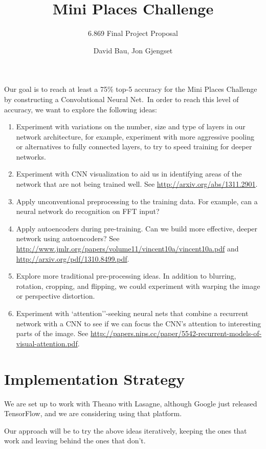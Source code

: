 \documentclass[letterpaper]{scrartcl}
\title{Mini Places Challenge}
\subtitle{6.869 Final Project Proposal}
\author{David Bau, Jon Gjengset}
\begin{document}
\maketitle

Our goal is to reach at least a 75\% top-5 accuracy for the Mini Places
Challenge by constructing a Convolutional Neural Net.\ In order to reach
this level of accuracy, we want to explore the following ideas:
\begin{enumerate}
\item Experiment with variations on the number, size and type of layers in our
	network architecture, for example, experiment with more aggressive
	pooling or alternatives to fully connected layers, to try to speed
	training for deeper networks.
\item Experiment with CNN visualization to aid us in identifying
	areas of the network that are not being trained well. See
	\url{http://arxiv.org/abs/1311.2901}.
\item Apply unconventional preprocessing to the training data. For
	example, can a neural network do recognition on FFT input?
\item Apply autoencoders during pre-training. Can we build more
	effective, deeper network using autoencoders? See
	\url{http://www.jmlr.org/papers/volume11/vincent10a/vincent10a.pdf}
	and \url{http://arxiv.org/pdf/1310.8499.pdf}.
\item Explore more traditional pre-processing ideas. In addition to
	blurring, rotation, cropping, and flipping, we could experiment
	with warping the image or perspective distortion.
\item Experiment with `attention''-seeking neural nets that combine a
	recurrent network with a CNN to see if we can focus the CNN's
	attention to interesting parts of the image. See
	\url{http://papers.nips.cc/paper/5542-recurrent-models-of-visual-attention.pdf}.
\end{enumerate}

\section*{Implementation Strategy}

We are set up to work with Theano with Lasagne, although Google just released
TensorFlow, and we are considering using that platform.

Our approach will be to try the above ideas iteratively, keeping the ones
that work and leaving behind the ones that don't.
\end{document}
